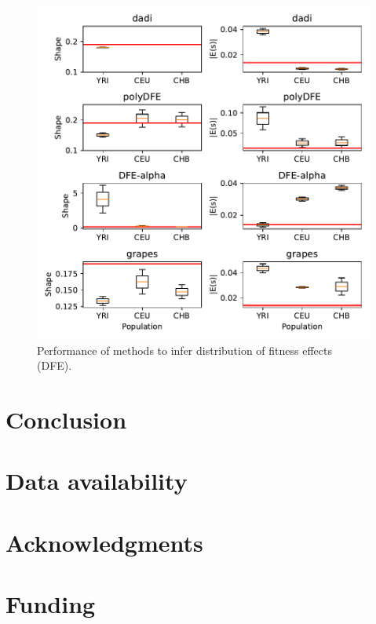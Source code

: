 \documentclass[hidelinks]{article}
\begin{document}
    \begin{figure}[ht]
        \centering
        \includegraphics[width=\textwidth]{figures/HomSap/dfe.inference.benchmark}
        \caption{
        \label{fig:dfe_humans}
        Performance of methods to infer distribution of fitness effects (DFE).
        }
    \end{figure}




\section*{Conclusion}
    \label{conclusion}

\section*{Data availability}\label{data_availability}


\section*{Acknowledgments}\label{acknowledgements}

\section*{Funding}
    \label{funding}


\end{document}
